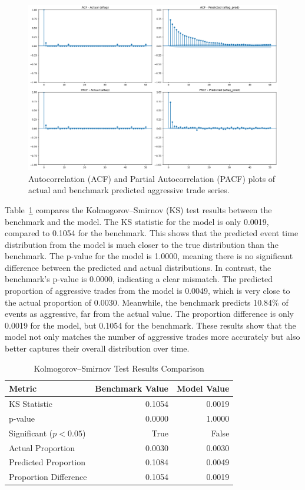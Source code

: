 \begin{figure}[H]
    \centering
    \includegraphics[width=0.95\linewidth]{figures/ACF_181330_benchmark.png}
    \caption{Autocorrelation (ACF) and Partial Autocorrelation (PACF) plots of actual and benchmark predicted aggressive trade series.}
    \label{fig:acf-pacf-com}
\end{figure}

Table~\ref{tb:ks-test-com} compares the Kolmogorov--Smirnov (KS) test results between the benchmark and the model. The KS statistic for the model is only 0.0019, compared to 0.1054 for the benchmark. This shows that the predicted event time distribution from the model is much closer to the true distribution than the benchmark. The p-value for the model is 1.0000, meaning there is no significant difference between the predicted and actual distributions. 
In contrast, the benchmark's p-value is 0.0000, indicating a clear mismatch.  The predicted proportion of aggressive trades from the model is 0.0049, which is very close to the actual proportion of 0.0030. Meanwhile, the benchmark predicts 10.84\% of events as aggressive, far from the actual value. The proportion difference is only 0.0019 for the model, but 0.1054 for the benchmark. These results show that the model not only matches the number of aggressive trades more accurately but also better captures their overall distribution over time.

\begin{table}[H]
    \centering
    \caption{Kolmogorov--Smirnov Test Results Comparison}
    \label{tb:ks-test-com}
    \begin{tabular}{lrr}
    \toprule
    \textbf{Metric} & \textbf{Benchmark Value} & \textbf{Model Value}\\
    \midrule
    KS Statistic & 0.1054 & 0.0019 \\
    p-value & 0.0000 & 1.0000 \\
    Significant ($p < 0.05$) & True & False \\
    Actual Proportion & 0.0030 & 0.0030 \\
    Predicted Proportion & 0.1084 & 0.0049 \\
    Proportion Difference & 0.1054 & 0.0019 \\
    \bottomrule
    \end{tabular}
\end{table}